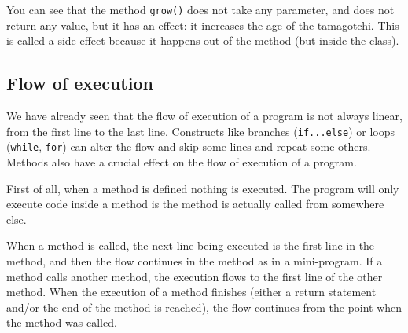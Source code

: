 You can see that the method \verb+grow()+ does not take any parameter,
and does not return any value, but it has an effect: it increases the
age of the tamagotchi. This is called a side effect because it happens
out of the method (but inside the class). 

\subsection{Flow of execution}
\label{sec:flow-execution}

We have already seen that the flow of execution of a program is not
always linear, from the first line to the last line. Constructs like
branches (\verb+if...else+) or loops (\verb+while+, \verb+for+) can
alter the flow and skip some lines and repeat some others. Methods
also have a crucial effect on the flow of execution of a program. 

First of all, when a method is defined nothing is executed. The
program will only execute code inside a method is the method is
actually called from somewhere else. 

When a method is called, the next line being executed is the first
line in the method, and then the flow continues in the method as in a
mini-program. If a method calls another method, the execution flows to
the first line of the other method. When the execution of a method
finishes (either a return statement and/or the end of the method is
reached), the flow continues from the point when the method was
called. 



